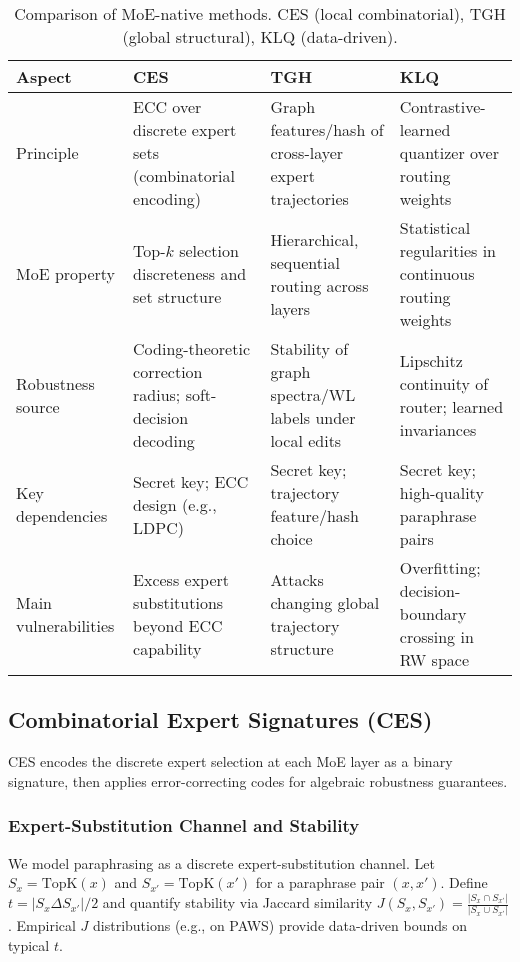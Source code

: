 \begin{table*}[t]
\centering
\small
\begin{tabular}{|l|p{3.2cm}|p{3.2cm}|p{3.2cm}|}
\hline
\textbf{Aspect} & \textbf{CES} & \textbf{TGH} & \textbf{KLQ} \\
\hline
Principle & ECC over discrete expert sets (combinatorial encoding) & Graph features/hash of cross-layer expert trajectories & Contrastive-learned quantizer over routing weights \\
MoE property & Top-$k$ selection discreteness and set structure & Hierarchical, sequential routing across layers & Statistical regularities in continuous routing weights \\
Robustness source & Coding-theoretic correction radius; soft-decision decoding & Stability of graph spectra/WL labels under local edits & Lipschitz continuity of router; learned invariances \\
Key dependencies & Secret key; ECC design (e.g., LDPC) & Secret key; trajectory feature/hash choice & Secret key; high-quality paraphrase pairs \\
Main vulnerabilities & Excess expert substitutions beyond ECC capability & Attacks changing global trajectory structure & Overfitting; decision-boundary crossing in RW space \\
\hline
\end{tabular}
\caption{Comparison of MoE-native methods. CES (local combinatorial), TGH (global structural), KLQ (data-driven).}
\label{tab:method_compare}
\end{table*}

\subsection{Combinatorial Expert Signatures (CES)}

CES encodes the discrete expert selection at each MoE layer as a binary signature, then applies error-correcting codes for algebraic robustness guarantees.

\subsubsection{Expert-Substitution Channel and Stability}

We model paraphrasing as a discrete expert-substitution channel. Let $S_x = \text{TopK}(x)$ and $S_{x'} = \text{TopK}(x')$ for a paraphrase pair $(x,x')$. Define $t = |S_x \Delta S_{x'}|/2$ and quantify stability via Jaccard similarity $J(S_x,S_{x'}) = \frac{|S_x \cap S_{x'}|}{|S_x \cup S_{x'}|}$. Empirical $J$ distributions (e.g., on PAWS) provide data-driven bounds on typical $t$.

